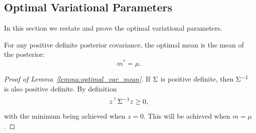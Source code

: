 



\subsection{Optimal Variational Parameters} \label{ap:variational-proofs}
In this section we restate and  prove the optimal variational parameters. 

\begin{lemma*} 
    For any positive definite posterior covariance, the optimal mean is the mean of the posterior: 
    \begin{equation} 
        m^* = \mu.
    \end{equation}
\end{lemma*}

\begin{proof}[Proof of Lemma~\ref{lemma:optimal_var_mean}]
    If $\Sigma$ is positive definite, then $\Sigma^{-1}$ is also positive definite. By definition 
    \begin{equation}
        z^\top  \Sigma^{-1}z \geq 0,
    \end{equation}
    with the minimum being achieved when $z = 0$. This will be achieved when $m = \mu$.
\end{proof}




